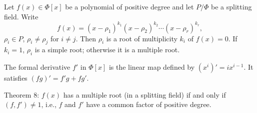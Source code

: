 Let $f(x) \in \Phi[x]$ be a polynomial of positive degree and let $P/\Phi$ be a splitting field. Write
$$f(x) = (x - \rho_1)^{k_1}(x - \rho_2)^{k_2} \cdots (x - \rho_r)^{k_r},$$
$\rho_i \in P$, $\rho_i \neq \rho_j$ for $i \neq j$. Then $\rho_i$ is a root of multiplicity $k_i$ of $f(x) = 0$. If $k_i = 1$, $\rho_i$ is a simple root; otherwise it is a multiple root.

The formal derivative $f'$ in $\Phi[x]$ is the linear map defined by $(x^i)' = i x^{i-1}$. It satisfies $(fg)' = f'g + fg'$.

Theorem 8: $f(x)$ has a multiple root (in a splitting field) if and only if $(f, f') \neq 1$, i.e., $f$ and $f'$ have a common factor of positive degree.
